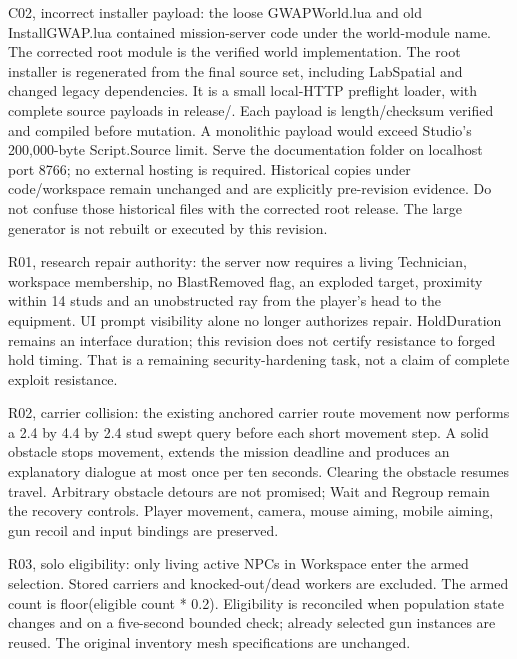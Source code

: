 C02, incorrect installer payload: the loose GWAPWorld.\allowbreak{}lua and old InstallGWAP.\allowbreak{}lua contained mission-server code under the world-module name.\allowbreak{} The corrected root module is the verified world implementation.\allowbreak{} The root installer is regenerated from the final source set, including LabSpatial and changed legacy dependencies.\allowbreak{} It is a small local-HTTP preflight loader, with complete source payloads in release/\allowbreak{}.\allowbreak{} Each payload is length/\allowbreak{}checksum verified and compiled before mutation.\allowbreak{} A monolithic payload would exceed Studio's 200,000-byte Script.\allowbreak{}Source limit.\allowbreak{} Serve the documentation folder on localhost port 8766; no external hosting is required.\allowbreak{} Historical copies under code/\allowbreak{}workspace remain unchanged and are explicitly pre-revision evidence.\allowbreak{} Do not confuse those historical files with the corrected root release.\allowbreak{} The large generator is not rebuilt or executed by this revision.\allowbreak{}

R01, research repair authority: the server now requires a living Technician, workspace membership, no BlastRemoved flag, an exploded target, proximity within 14 studs and an unobstructed ray from the player's head to the equipment.\allowbreak{} UI prompt visibility alone no longer authorizes repair.\allowbreak{} HoldDuration remains an interface duration; this revision does not certify resistance to forged hold timing.\allowbreak{} That is a remaining security-hardening task, not a claim of complete exploit resistance.\allowbreak{}

R02, carrier collision: the existing anchored carrier route movement now performs a 2.\allowbreak{}4 by 4.\allowbreak{}4 by 2.\allowbreak{}4 stud swept query before each short movement step.\allowbreak{} A solid obstacle stops movement, extends the mission deadline and produces an explanatory dialogue at most once per ten seconds.\allowbreak{} Clearing the obstacle resumes travel.\allowbreak{} Arbitrary obstacle detours are not promised; Wait and Regroup remain the recovery controls.\allowbreak{} Player movement, camera, mouse aiming, mobile aiming, gun recoil and input bindings are preserved.\allowbreak{}

R03, solo eligibility: only living active NPCs in Workspace enter the armed selection.\allowbreak{} Stored carriers and knocked-out/\allowbreak{}dead workers are excluded.\allowbreak{} The armed count is floor(eligible count * 0.\allowbreak{}2).\allowbreak{} Eligibility is reconciled when population state changes and on a five-second bounded check; already selected gun instances are reused.\allowbreak{} The original inventory mesh specifications are unchanged.\allowbreak{}


